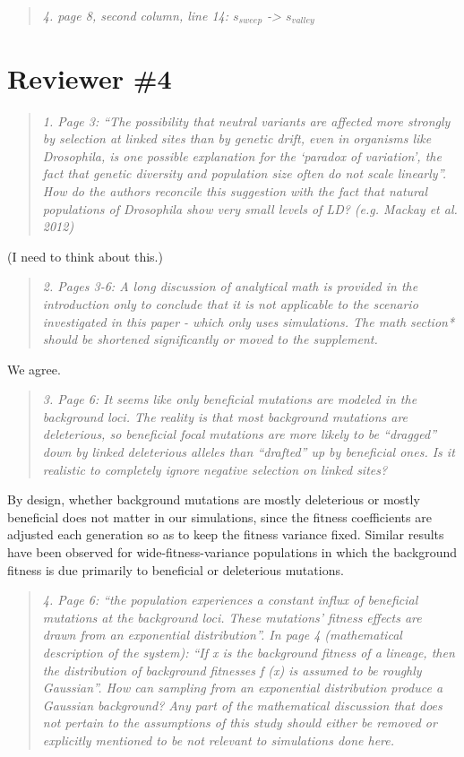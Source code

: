\documentclass[11pt]{article}
\newenvironment{reviewerquote}{\begin{quote}\color{black}\itshape}{\end{quote}}
\begin{document}
\begin{reviewerquote}
4. page 8, second column, line 14: $s_{sweep}$ -> $s_{valley}$
\end{reviewerquote}

\section*{Reviewer \#4}

\begin{reviewerquote}
1. Page 3: “The possibility that neutral variants are affected more strongly by selection at linked sites than by genetic drift, even in organisms like Drosophila, is one possible explanation for the ‘paradox of variation’, the fact that genetic diversity and population size often do not scale linearly”.
How do the authors reconcile this suggestion with the fact that natural populations of Drosophila show very small levels of LD? (e.g. Mackay et al. 2012)
\end{reviewerquote}

(I need to think about this.)

\begin{reviewerquote}
2. Pages 3-6: A long discussion of analytical math is provided in the introduction only to conclude that it is not applicable to the scenario investigated in this paper - which only uses simulations. The math section* should be shortened significantly or moved to the supplement.
\end{reviewerquote}

We agree.

\begin{reviewerquote}
3. Page 6: It seems like only beneficial mutations are modeled in the background loci. The reality is that most background mutations are deleterious, so beneficial focal mutations are more likely to be “dragged” down by linked deleterious alleles than “drafted” up by beneficial ones. Is it realistic to completely ignore negative selection on linked sites?
\end{reviewerquote}

By design, whether background mutations are mostly deleterious or mostly beneficial does not matter in our simulations, since the fitness coefficients are adjusted each generation so as to keep the fitness variance fixed. Similar results have been observed for wide-fitness-variance populations in which the background fitness is due primarily to beneficial or deleterious mutations.

\begin{reviewerquote}
4. Page 6: “the population experiences a constant influx of beneficial mutations at the background loci. These mutations’ fitness effects are drawn from an exponential distribution”. In page 4 (mathematical description of the system): “If x is the background fitness of a lineage, then the distribution of background fitnesses f (x) is assumed to be roughly Gaussian”. How can sampling from an exponential distribution produce a Gaussian background? Any part of the mathematical discussion that does not pertain to the assumptions of this study should either be removed or explicitly mentioned to be not relevant to simulations done here.
\end{reviewerquote}
\end{document}
